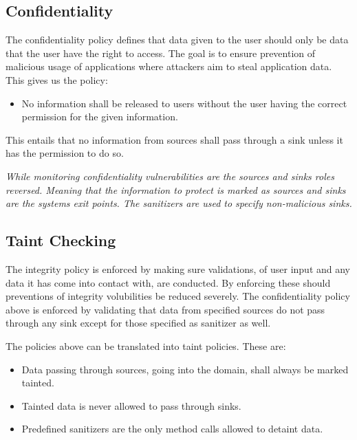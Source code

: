 \subsection{Confidentiality}
\label{Confidentiality}
The confidentiality policy defines that data given to the user should only be data that the user have the right to access. The goal is to ensure prevention of malicious usage of applications where attackers aim to steal application data. This gives us the policy:

\hfill
\begin{itemize}
    \item No information shall be released to users without the user having the correct permission for the given information.
\end{itemize}
\hfill

This entails that no information from sources shall pass through a sink unless it has the permission to do so.

\textit{While monitoring confidentiality vulnerabilities are the sources and sinks roles reversed. Meaning that the information to protect is marked as sources and sinks are the systems exit points. The sanitizers are used to specify non-malicious sinks.}



\subsection{Taint Checking}
The integrity policy is enforced by making sure validations, of user input and any data it has come into contact with, are conducted. By enforcing these should preventions of integrity volubilities be reduced severely. The confidentiality policy above is enforced by validating that data from specified sources do not pass through any sink except for those specified as sanitizer as well.

The policies above can be translated into taint policies. These are:

\hfill
\begin{itemize}
    \item Data passing through sources, going into the domain, shall always be marked tainted.
    \item Tainted data is never allowed to pass through sinks.
    \item Predefined sanitizers are the only method calls allowed to detaint data.
\end{itemize}
\hfill



